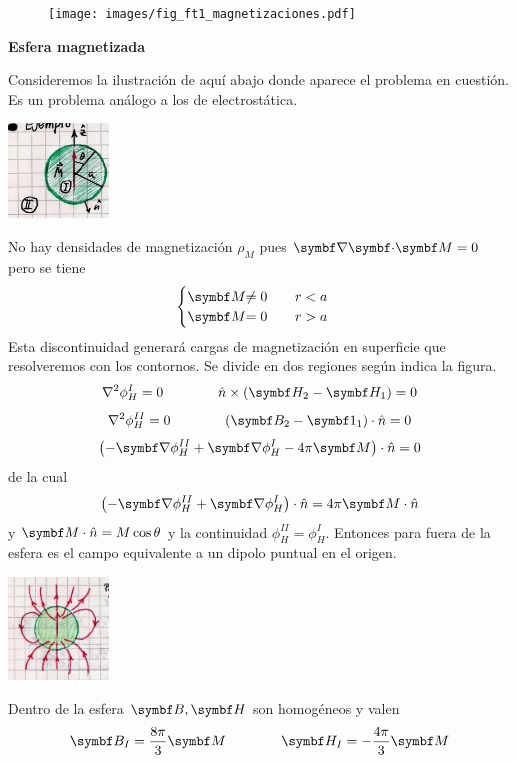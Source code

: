 \documentclass[10pt,oneside]{CBFT_book}
\begin{document}

\begin{figure}[htb]
	\begin{center}
	\texttt{[image: images/fig\_ft1\_magnetizaciones.pdf]}	 
	\end{center}
	\caption{}
\end{figure}

\begin{ejemplo}{\bf Esfera magnetizada}
 
Consideremos la ilustración de aquí abajo donde aparece el problema en cuestión.
Es un problema análogo a los de electrostática.

\includegraphics[width=0.2\textwidth]{images/fig_ft1_esfera_magnetizada.jpg}

No hay densidades de magnetización $\rho_M$ pues $\divem{M}=0$ pero se tiene
\[
	\begin{cases}
	$\vb{M}$ \neq 0 \qquad r < a \\
	$\vb{M}$ = 0 \qquad r > a 
	\end{cases}
\]
Esta discontinuidad generará cargas de magnetización en superficie que resolveremos con
los contornos. Se divide en dos regiones según indica la figura.
\[
	\lapm{\phi^I_H} = 0 \qquad \qquad \hat{n} \times (\vb{H}_2 - \vb{H}_1 ) = 0
\]
\[
	\lapm{\phi^{II}_H} = 0 \qquad \qquad (\vb{B}_2 - \vb{1}_1 ) \cdot \hat{n} = 0
\]
\[
	\left( - \Nabla\phi_H^{II} + \Nabla\phi_H^I - 4 \pi \vb{M} \right) \cdot \hat{n} = 0
\]
de la cual
\[
	\left( - \Nabla\phi_H^{II} + \Nabla\phi_H^I \right) \cdot \hat{n} = 4 \pi \vb{M}\cdot \hat{n}
\]
y $\vb{M}\cdot \hat{n} = M \cos\theta $ y la continuidad $ \phi_H^{II} = \phi_H^{I} $.
Entonces para fuera de la esfera es el campo equivalente a un dipolo puntual en el origen.

\includegraphics[width=0.2\textwidth]{images/fig_ft1_esfera_magnetizada2.jpg}

Dentro de la esfera $\vb{B}, \vb{H}$ son homogéneos y valen
\[
	\vb{B}_I = \frac{8 \pi}{3} \vb{M} \qquad \qquad \vb{H}_I = -\frac{4 \pi}{3} \vb{M}
\]

\end{ejemplo}
\end{document}
